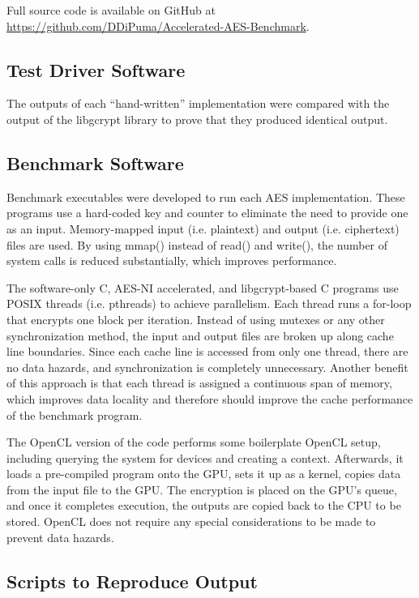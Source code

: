 \documentclass[a4paper,10pt]{article}
\begin{document}
Full source code is available on GitHub at \url{https://github.com/DDiPuma/Accelerated-AES-Benchmark}.

\subsection{Test Driver Software}

The outputs of each ``hand-written'' implementation were compared with the output of the libgcrypt library to prove that they produced identical output.

\subsection{Benchmark Software}

Benchmark executables were developed to run each AES implementation.  These programs use a hard-coded key and counter to eliminate the need to provide one as an input.  Memory-mapped input (i.e. plaintext) and output (i.e. ciphertext) files are used.  By using mmap() instead of read() and write(), the number of system calls is reduced substantially, which improves performance.

The software-only C, AES-NI accelerated, and libgcrypt-based C programs use POSIX threads (i.e. pthreads) to achieve parallelism.  Each thread runs a for-loop that encrypts one block per iteration.  Instead of using mutexes or any other synchronization method, the input and output files are broken up along cache line boundaries.  Since each cache line is accessed from only one thread, there are no data hazards, and synchronization is completely unnecessary.  Another benefit of this approach is that each thread is assigned a continuous span of memory, which improves data locality and therefore should improve the cache performance of the benchmark program.

The OpenCL version of the code performs some boilerplate OpenCL setup, including querying the system for devices and creating a context.  Afterwards, it loads a pre-compiled program onto the GPU, sets it up as a kernel, copies data from the input file to the GPU.  The encryption is placed on the GPU's queue, and once it completes execution, the outputs are copied back to the CPU to be stored.  OpenCL does not require any special considerations to be made to prevent data hazards.


\subsection{Scripts to Reproduce Output}
\end{document}
